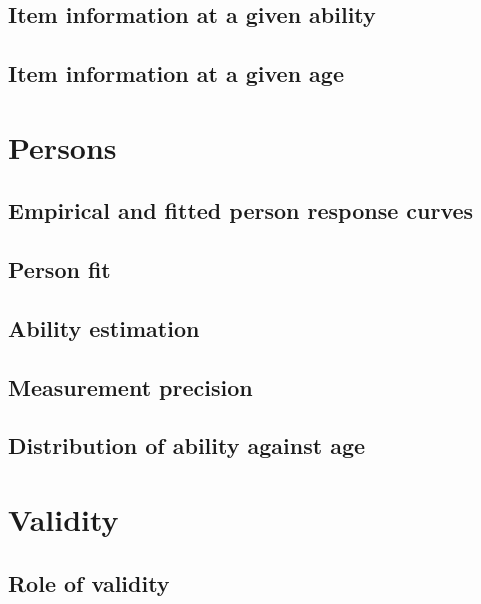 \documentclass[]{book}
\begin{document}
\section{Item information at a given
ability}\label{item-information-at-a-given-ability}

\section{Item information at a given
age}\label{item-information-at-a-given-age}

\chapter{Persons}\label{persons}

\section{Empirical and fitted person response
curves}\label{empirical-and-fitted-person-response-curves}

\section{Person fit}\label{person-fit}

\section{Ability estimation}\label{ability-estimation}

\section{Measurement precision}\label{measurement-precision}

\section{Distribution of ability against
age}\label{distribution-of-ability-against-age}

\chapter{Validity}\label{validity}

\section{Role of validity}\label{role-of-validity}
\end{document}
